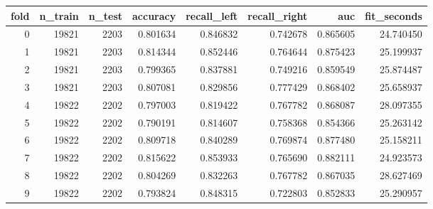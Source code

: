 \begin{tabular}{rrrrrrrr}
\toprule
fold & n_train & n_test & accuracy & recall_left & recall_right & auc & fit_seconds \\
\midrule
0 & 19821 & 2203 & 0.801634 & 0.846832 & 0.742678 & 0.865605 & 24.740450 \\
1 & 19821 & 2203 & 0.814344 & 0.852446 & 0.764644 & 0.875423 & 25.199937 \\
2 & 19821 & 2203 & 0.799365 & 0.837881 & 0.749216 & 0.859549 & 25.874487 \\
3 & 19821 & 2203 & 0.807081 & 0.829856 & 0.777429 & 0.868402 & 25.658937 \\
4 & 19822 & 2202 & 0.797003 & 0.819422 & 0.767782 & 0.868087 & 28.097355 \\
5 & 19822 & 2202 & 0.790191 & 0.814607 & 0.758368 & 0.854366 & 25.263142 \\
6 & 19822 & 2202 & 0.809718 & 0.840289 & 0.769874 & 0.877480 & 25.158211 \\
7 & 19822 & 2202 & 0.815622 & 0.853933 & 0.765690 & 0.882111 & 24.923573 \\
8 & 19822 & 2202 & 0.804269 & 0.832263 & 0.767782 & 0.867035 & 28.627469 \\
9 & 19822 & 2202 & 0.793824 & 0.848315 & 0.722803 & 0.852833 & 25.290957 \\
\bottomrule
\end{tabular}
